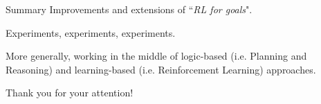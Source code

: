\documentclass{beamer}
\begin{document}
\begin{frame}{Summary}
		Improvements and extensions of ``\emph{RL for \LLf goals}".
		
		\vspace{0.5cm}
		
		Experiments, experiments, experiments.
		
		\vspace{0.5cm}
		
		More generally, working in the middle of logic-based (i.e. Planning and Reasoning) and learning-based (i.e. Reinforcement Learning) approaches.
	
\end{frame}

\begin{frame}
	\begin{center}
	Thank you for your attention!
	\end{center}
\end{frame}
\end{document}
